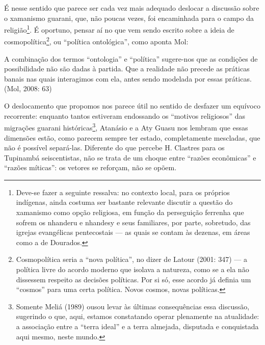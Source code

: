 \documentclass{article}
\begin{document}
\'E nesse sentido que parece ser cada vez mais adequado deslocar a
discuss\~ao sobre o xamanismo guarani, que, n\~ao poucas vezes, foi
encaminhada para o campo da religi\~ao\footnote{ Deve-se fazer a
seguinte ressalva: no contexto local, para os pr\'oprios ind\'igenas,
ainda costuma ser bastante relevante discutir a quest\~ao do xamanismo
como op\c{c}\~ao religiosa, em fun\c{c}\~ao da persegui\c{c}\~ao
ferrenha que sofrem os nhanderu e nhandesy e seus familiares, por
parte, sobretudo, das igrejas evang\'elicas pentecostais --- as quais
se contam \`as dezenas, em \'areas como a de Dourados. }. \'E oportuno,
pensar a\'i no que vem sendo escrito sobre a ideia de
cosmopol\'itica\footnote{ Cosmopol\'itica seria a
{\textquotedblleft}nova pol\'itica{\textquotedblright}, no dizer de
Latour (2001: 347) --- a pol\'itica livre do acordo moderno que isolava
a natureza, como se a ela n\~ao dissessem respeito as decis\~oes
pol\'iticas. Por si s\'o, esse acordo j\'a definia um
{\textquotedblleft}cosmos{\textquotedblright} para uma certa
pol\'itica. Novos cosmos, novas pol\'iticas.}, ou
{\textquotedblleft}pol\'itica ontol\'ogica{\textquotedblright}, como
aponta Mol: 

A combina\c{c}\~ao dos termos
{\textquotedblleft}ontologia{\textquotedblright} e
{\textquotedblleft}pol\'itica{\textquotedblright} sugere-nos que as
condi\c{c}\~oes de possibilidade n\~ao s\~ao dadas \`a partida. Que a
realidade n\~ao precede as pr\'aticas banais nas quais interagimos com
ela, antes sendo modelada por essas pr\'aticas. (Mol, 2008: 63)

O deslocamento que propomos nos parece \'util no sentido de desfazer um
equ\'ivoco recorrente: enquanto tantos estiveram endossando os
{\textquotedblleft}motivos religiosos{\textquotedblright} das
migra\c{c}\~oes guarani hist\'oricas\footnote{ Somente Meli\'a (1989)
ousou levar \`as \'ultimas consequ\^encias essa discuss\~ao, sugerindo
o que, aqui, estamos constatando operar plenamente na atualidade: a
associa\c{c}\~ao entre a {\textquotedblleft}terra
ideal{\textquotedblright} e a terra almejada, disputada e conquistada
aqui mesmo, neste mundo.}, Atan\'asio e a Aty Guasu nos lembram que
essas dimens\~oes est\~ao, como parecem sempre ter estado,
completamente mescladas, que n\~ao \'e poss\'ivel separ\'a-las.
Diferente do que percebe H. Clastres para os Tupinamb\'a seiscentistas,
n\~ao se trata de um choque entre {\textquotedblleft}raz\~oes
econ\^omicas{\textquotedblright} e {\textquotedblleft}raz\~oes
m\'iticas{\textquotedblright}: os vetores se refor\c{c}am, n\~ao se
op\~oem.
\end{document}
